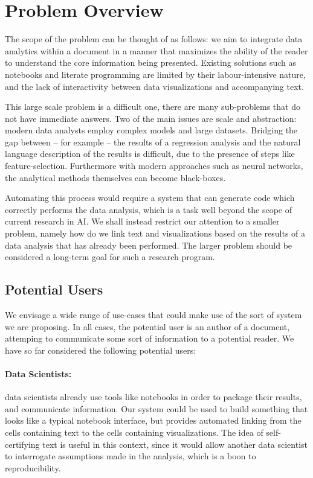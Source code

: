 \section{Problem Overview}
\label{sec:overview}

The scope of the problem can be thought of as follows: we aim to integrate data analytics within
a document in a manner that maximizes the ability of the reader to understand the core information
being presented. Existing solutions such as notebooks and literate programming are limited by their
labour-intensive nature, and the lack of interactivity between data visualizations and accompanying text.

This large scale problem is a difficult one, there are many sub-problems that do not have immediate answers.
Two of the main issues are scale and abstraction: modern data analysts employ complex models and large datasets.
Bridging the gap between -- for example -- the results of a regression analysis and the natural language description
of the results is difficult, due to the presence of steps like feature-selection. Furthermore with modern approaches
such as neural networks, the analytical methods themselves can become black-boxes.

Automating this process would require a system that can generate code which correctly performs the data analysis,
which is a task well beyond the scope of current research in AI. We shall instead restrict our attention to a smaller
problem, namely how do we link text and visualizations based on the results of a data analysis that has already been
performed. The larger problem should be considered a long-term goal for such a research program.

\subsection{Potential Users}
We envisage a wide range of use-cases that could make use of the sort of system we are proposing.
In all cases, the potential user is an author of a document, attemping to communicate some sort of information to a potential reader.
We have so far considered the following potential users:

\paragraph{Data Scientists:} data scientists already use tools like notebooks in order to package their results, and
communicate information. Our system could be used to build something that looks like a typical notebook interface, but
provides automated linking from the cells containing text to the cells containing visualizations. The idea of self-certifying
text is useful in this context, since it would allow another data scientist to interrogate assumptions made in the analysis,
which is a boon to reproducibility.

